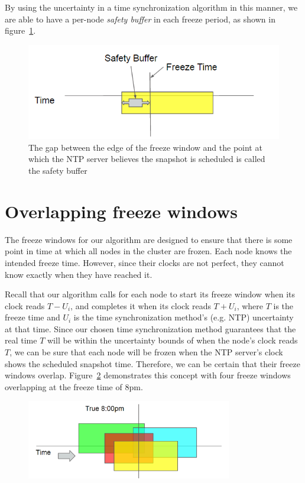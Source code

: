 By using the uncertainty in a time synchronization algorithm in this
manner, we are able to have a per-node \textit{safety buffer} in each
freeze period, as shown in figure~\ref{fig:safety-buff}.

\begin{figure}
\includegraphics{safety-diagram.png}
\caption{The gap between the edge of the freeze window and the point at which the NTP server believes the snapshot is scheduled is called the safety buffer}
\label{fig:safety-buff}
\end{figure}

\section{Overlapping freeze windows}

The freeze windows for our algorithm are designed to ensure
that there is some point in time at which all nodes in the cluster are
frozen. Each node knows the intended freeze time. However, since their
clocks are not perfect, they cannot know exactly when they have reached it.

Recall that our algorithm calls for each node to start its freeze
window when its clock reads $T - U_i$, and completes it when its clock
reads $T + U_i$, where $T$ is the freeze time and $U_i$ is the time
synchronization method's (e.g. NTP) uncertainty at that time.  Since
our chosen time synchronization method guarantees that the real time
$T$ will be within the uncertainty bounds of when the node's clock
reads $T$, we can be sure that each node will be frozen when the NTP
server's clock shows the scheduled snapshot time. Therefore, we can be
certain that their freeze windows overlap.
Figure~\ref{fig:overlapping-windows} demonstrates this concept with
four freeze windows overlapping at the freeze time of 8pm.

\begin{figure}[h]
  \centering
  \caption{}
  \label{fig:overlapping-windows}
  \includegraphics[width=0.8\textwidth]{overlapping-windows.png}
\end{figure}
